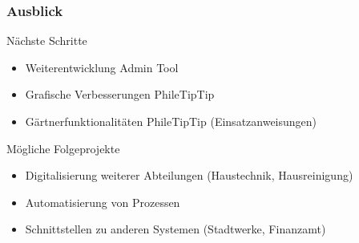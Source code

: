 \begin{frame}
  \frametitle{Ausblick}

  \begin{block}{Nächste Schritte}
 	\begin{itemize}
	\item Weiterentwicklung Admin Tool
	 \item Grafische Verbesserungen PhileTipTip
	\item Gärtnerfunktionalitäten PhileTipTip (Einsatzanweisungen)
	\end{itemize}
  \end{block}

  \begin{alertblock}{Mögliche Folgeprojekte}
 	\begin{itemize}
	\item Digitalisierung weiterer Abteilungen (Haustechnik, Hausreinigung)
	 \item Automatisierung von Prozessen
	\item Schnittstellen zu anderen Systemen (Stadtwerke, Finanzamt)
	\end{itemize}
  \end{alertblock}

\end{frame}